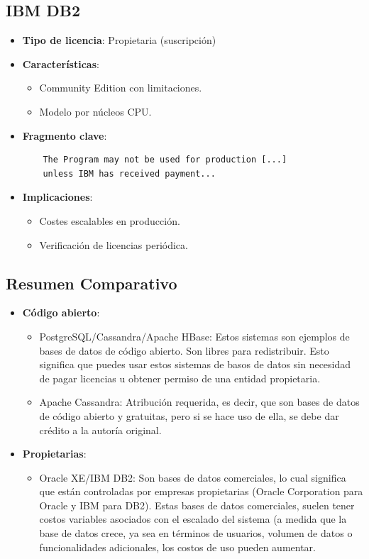 \documentclass{article}
\begin{document}
\subsection{IBM DB2}
\begin{itemize}
    \item \textbf{Tipo de licencia}: Propietaria (suscripción)
    \item \textbf{Características}:
    \begin{itemize}
        \item Community Edition con limitaciones.
        \item Modelo por núcleos CPU.
    \end{itemize}
    \item \textbf{Fragmento clave}:
    \begin{verbatim}
    The Program may not be used for production [...] 
    unless IBM has received payment...
    \end{verbatim}
    \item \textbf{Implicaciones}:
    \begin{itemize}
        \item Costes escalables en producción.
        \item Verificación de licencias periódica.
    \end{itemize}
\end{itemize}

\subsection{Resumen Comparativo}
\begin{itemize}
    \item \textbf{Código abierto}:
    \begin{itemize}
        \item PostgreSQL/Cassandra/Apache HBase: Estos sistemas son ejemplos de bases de datos de código abierto. Son libres para redistribuir. Esto significa que puedes usar estos sistemas de basos de datos sin necesidad de pagar licencias u obtener permiso de una entidad propietaria. 
        \item Apache Cassandra: Atribución requerida, es decir, que son bases de datos de código abierto y gratuitas, pero si se hace uso de ella, se debe dar crédito a la autoría original. 
    \end{itemize}
    
    \item \textbf{Propietarias}:
    \begin{itemize}
        \item Oracle XE/IBM DB2: Son bases de datos comerciales, lo cual significa que están controladas por empresas propietarias (Oracle Corporation para Oracle y IBM para DB2). Estas bases de datos comerciales, suelen tener costos variables asociados con el escalado del sistema (a medida que la base de datos crece, ya sea en términos de usuarios, volumen de datos o funcionalidades adicionales, los costos de uso pueden aumentar.
    \end{itemize}
\end{itemize}
\end{document}
